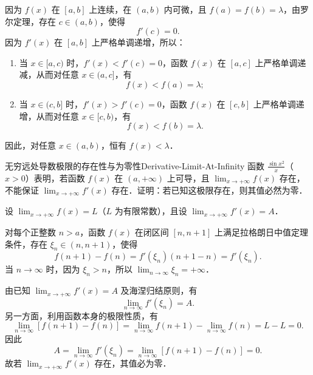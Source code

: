 \begin{myproof}
    因为 $f(x)$ 在 $[a, b]$ 上连续，在 $(a, b)$ 内可微，且 $f(a) = f(b) = \lambda$，由罗尔定理，存在 $c \in (a, b)$，使得
    \begin{equation}
        f'(c) = 0.
    \end{equation}
    因为 $f'(x)$ 在 $[a, b]$ 上严格单调递增，所以：
    \begin{enumerate}
        \item 当 $x \in [a, c)$ 时，$f'(x) < f'(c) = 0$，函数 $f(x)$ 在 $[a, c]$ 上严格单调递减，从而对任意 $x \in (a, c]$，有
              \begin{equation}
                  f(x) < f(a) = \lambda;
              \end{equation}
        \item 当 $x \in (c, b]$ 时，$f'(x) > f'(c) = 0$，函数 $f(x)$ 在 $[c, b]$ 上严格单调递增，从而对任意 $x \in [c, b)$，有
              \begin{equation}
                  f(x) < f(b) = \lambda.
              \end{equation}
    \end{enumerate}
    因此，对任意 $x \in (a, b)$，恒有 $f(x) < \lambda$．
\end{myproof}

\begin{problem}{无穷远处导数极限的存在性与为零性}{Derivative-Limit-At-Infinity}
    函数 $\frac{\sin x^2}{x}$（$x > 0$）表明，若函数 $f(x)$ 在 $(a, +\infty)$ 上可导，且 $\lim_{x\to +\infty} f(x)$ 存在，不能保证 $\lim_{x\to +\infty} f'(x)$ 存在．证明：若已知这极限存在，则其值必然为零．
\end{problem}

\begin{myproof}
    设 $\lim_{x\to +\infty} f(x) = L$（$L$ 为有限常数），且设 $\lim_{x\to +\infty} f'(x) = A$．

    对每个正整数 $n > a$，函数 $f(x)$ 在闭区间 $[n, n+1]$ 上满足拉格朗日中值定理条件，存在 $\xi_n \in (n, n+1)$，使得
    \begin{equation}
        f(n+1) - f(n) = f'(\xi_n)(n+1 - n) = f'(\xi_n).
    \end{equation}
    当 $n \to \infty$ 时，因为 $\xi_n > n$，所以 $\lim_{n\to\infty} \xi_n = +\infty$．

    由已知 $\lim_{x\to +\infty} f'(x) = A$ 及海涅归结原则，有
    \begin{equation}
        \lim_{n\to\infty} f'(\xi_n) = A.
    \end{equation}
    另一方面，利用函数本身的极限性质，有
    \begin{equation}
        \lim_{n\to\infty} [f(n+1) - f(n)] = \lim_{n\to\infty} f(n+1) - \lim_{n\to\infty} f(n) = L - L = 0.
    \end{equation}
    因此
    \begin{equation}
        A = \lim_{n\to\infty} f'(\xi_n) = \lim_{n\to\infty} [f(n+1) - f(n)] = 0.
    \end{equation}
    故若 $\lim_{x\to +\infty} f'(x)$ 存在，其值必为零．
\end{myproof}

